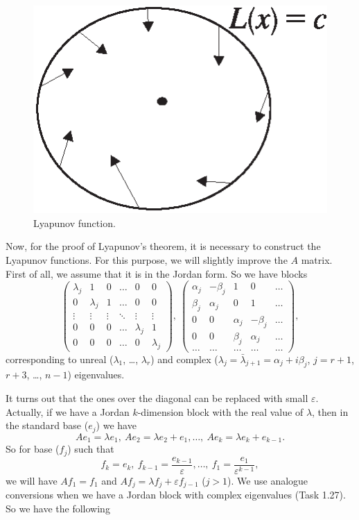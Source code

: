 \begin{figure}[!ht]
	\centering
	\includegraphics[scale=1.4]{jtr13} 
	\caption{Lyapunov function.}
	\label{fig:Lyapunov_funct}
\end{figure}

Now, for the proof of Lyapunov's theorem, it is necessary to construct the Lyapunov functions. For this purpose, we will slightly improve the $A$ matrix. First of all, we assume that it is in the Jordan form. So we have blocks
$$ \begin{pmatrix}
\lambda_j & 1 & 0 & \ldots & 0 & 0\\ 
0& \lambda_j & 1 & \ldots & 0 & 0\\ 
\vdots& \vdots & \vdots & \ddots & \vdots & \vdots\\ 
0& 0 & 0 & \ldots & \lambda_j & 1\\ 
0& 0 & 0 & \ldots & 0 & \lambda_j
\end{pmatrix},\ \begin{pmatrix}
\alpha_j & -\beta_j & 1 & 0 & \ldots\\ 
\beta_j& \alpha_j & 0 & 1 & \ldots\\ 
0 &0  & \alpha_j & -\beta_j & \ldots\\ 
0 & 0 & \beta_j & \alpha_j & \ldots\\ 
\ldots & \ldots & \ldots & \ldots & \ldots
\end{pmatrix},$$
corresponding to unreal ($\lambda_1$, \dots, $\lambda_r$) and complex ($\lambda_j = \bar{\lambda}_{j+1} = \alpha_j+ i\beta_j$, $j = r+1$, $r+3$, \dots, $n-1$) eigenvalues.

It turns out that the ones over the diagonal can be replaced with small $\varepsilon$. Actually, if we have a Jordan $k$-dimension block with the real value of $\lambda$, then in the standard base ($e_j$) we have
$$Ae_1 = \lambda e_1,\ Ae_2 = \lambda e_2 + e_1, \ldots,\ Ae_k = \lambda e_k + e_{k-1}.$$
So for base ($f_j$) such that
$$f_k = e_k,\ f_{k-1} = \frac{e_{k-1}}{\varepsilon}, \ldots,\ f_1 = \frac{e_1}{\varepsilon^{k-1}},$$
we will have $Af_1 = f_1$ and $Af_j = \lambda f_j + \varepsilon f_{j-1}$ ($j>1$). We use analogue conversions when we have a Jordan block with complex eigenvalues (Task 1.27). So we have the following

